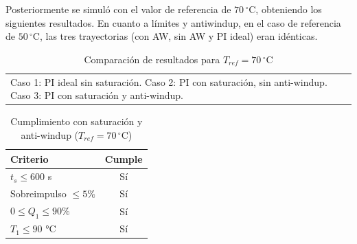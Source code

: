 \documentclass[journal]{IEEEtran}
\begin{document}
Posteriormente se simuló con el valor de referencia de $70\,^\circ\mathrm{C}$, obteniendo los siguientes resultados. En cuanto a límites y antiwindup, en el caso de referencia de $50\,^\circ\mathrm{C}$, las tres trayectorias (con AW, sin AW y PI ideal) eran idénticas.


\begin{table}[h!]
\centering
\caption{Comparación de resultados para $T_{ref} = 70\,^\circ$C}
\label{tab:comparacion_70}
\footnotesize
\vspace{2pt}
\begin{tabular}{@{}p{}@{}}
Caso 1: PI ideal sin saturación. \quad
Caso 2: PI con saturación, sin anti-windup. \quad
Caso 3: PI con saturación y anti-windup.
\end{tabular}
\end{table}

\begin{table}[h!]
\centering
\caption{Cumplimiento con saturación y anti-windup ($T_{ref} = 70\,^\circ$C)}
\label{tab:cumplimiento_70}
\footnotesize
\begin{tabular}{lc}
\hline
\textbf{Criterio} & \textbf{Cumple} \\
\hline
$t_s \leq 600$ s        & Sí \\
Sobreimpulso $\leq 5\%$ & Sí \\
$0 \leq Q_1 \leq 90\%$  & Sí \\
$T_1 \leq 90$ °C        & Sí \\
\hline
\end{tabular}
\end{table}
\end{document}
